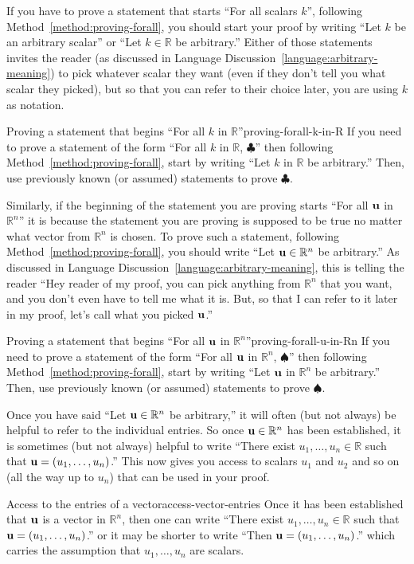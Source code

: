 \documentclass{book}
\theoremstyle{ekimcustom}
\begin{document}
If you have to prove a statement that starts ``For all scalars $k$'', following Method~\ref{method:proving-forall}, you should start your proof by writing ``Let $k$ be an arbitrary scalar'' or ``Let $k \in \mathbb{R}$ be arbitrary.'' Either of those statements invites the reader (as discussed in Language Discussion~\ref{language:arbitrary-meaning}) to pick whatever scalar they want (even if they don't tell you what scalar they picked), but so that you can refer to their choice later, you are using $k$ as notation.
\begin{bmethod}{Proving a statement that begins ``For all $k$ in $\mathbb{R}$''}{proving-forall-k-in-R}
If you need to prove a statement of the form ``For all $k$ in $\mathbb{R}$, $\clubsuit$'' then following Method~\ref{method:proving-forall}, start by writing ``Let $k$ in $\mathbb{R}$ be arbitrary.'' Then, use previously known (or assumed) statements to prove $\clubsuit$.
\end{bmethod}

Similarly, if the beginning of the statement you are proving starts ``For all ${\bf u}$ in $\mathbb{R}^n$'' it is because the statement you are proving is supposed to be true no matter what vector from $\mathbb{R}^n$ is chosen. To prove such a statement, following Method~\ref{method:proving-forall}, you should write ``Let ${\bf u} \in \mathbb{R}^n$ be arbitrary.'' As discussed in Language Discussion~\ref{language:arbitrary-meaning}, this is telling the reader ``Hey reader of my proof, you can pick anything from $\mathbb{R}^n$ that you want, and you don't even have to tell me what it is. But, so that I can refer to it later in my proof, let's call what you picked ${\bf u}$.''
\begin{bmethod}{Proving a statement that begins ``For all ${\bf u}$ in $\mathbb{R}^n$''}{proving-forall-u-in-Rn}
If you need to prove a statement of the form ``For all ${\bf u}$ in $\mathbb{R}^n$, $\spadesuit$'' then following Method~\ref{method:proving-forall}, start by writing ``Let ${\bf u}$ in $\mathbb{R}^n$ be arbitrary.'' Then, use previously known (or assumed) statements to prove $\spadesuit$.
\end{bmethod}

Once you have said ``Let ${\bf u} \in \mathbb{R}^n$ be arbitrary,'' it will often (but not always) be helpful to refer to the individual entries. So once ${\bf u} \in \mathbb{R}^n$ has been established, it is sometimes (but not always) helpful to write ``There exist $u_1,\dots,u_n \in \mathbb{R}$ such that ${\bf u} = (u_1,\dots,u_n)$.'' This now gives you access to scalars $u_1$ and $u_2$ and so on (all the way up to $u_n$) that can be used in your proof.
\begin{bmethod}{Access to the entries of a vector}{access-vector-entries}
Once it has been established that ${\bf u}$ is a vector in $\mathbb{R}^n$, then one can write ``There exist $u_1,\dots,u_n \in \mathbb{R}$ such that ${\bf u} = (u_1,\dots,u_n)$.'' or it may be shorter to write ``Then ${\bf u} = (u_1,\dots,u_n)$.'' which carries the assumption that $u_1,\dots,u_n$ are scalars.
\end{bmethod}
\end{document}
